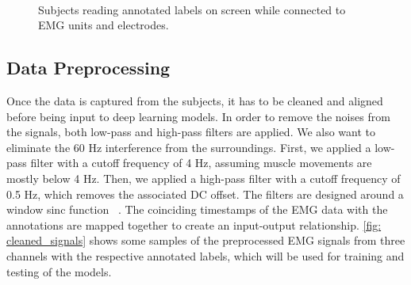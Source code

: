 \documentclass{article}
\begin{document}
\begin{figure}[!b] 
    \centering
    \\
  \caption{Subjects reading annotated labels on screen while connected to EMG units and electrodes.}
  \label{fig: conn-ann} 
\end{figure}


\subsection{Data Preprocessing}
\label{ssec:Cleaning Data}
Once the data is captured from the subjects, it has to be cleaned and aligned before being input to deep learning models. In order to remove the noises from the signals, both low-pass and high-pass filters are applied. We also want to eliminate the 60 Hz interference from the surroundings. First, we applied a low-pass filter with a cutoff frequency of 4 Hz, assuming  muscle movements are mostly below 4 Hz. Then, we applied a high-pass filter with a cutoff frequency of 0.5 Hz, which removes the associated DC offset. The filters are designed around a window sinc function ~\cite{noauthor_how_nodate}. The coinciding timestamps of the EMG data with the annotations are mapped together to create an input-output relationship. \figurename \ref{fig: cleaned_signals} shows some samples of the preprocessed EMG signals from three channels with the respective annotated labels, which will be  used for training and testing of the models. 
\end{document}
